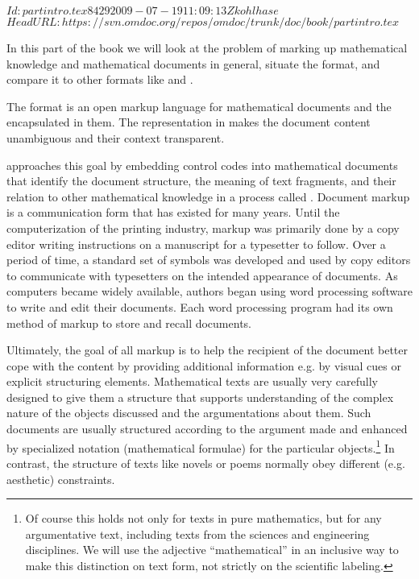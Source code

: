 \svnInfo $Id: partintro.tex 8429 2009-07-19 11:09:13Z kohlhase $
\svnKeyword $HeadURL: https://svn.omdoc.org/repos/omdoc/trunk/doc/book/partintro.tex $

\mockchapter
  In this part of the book we will look at the problem of marking up mathematical
  knowledge and mathematical documents in general, situate the {\omdoc} format, and
  compare it to other formats like {\openmath} and {\mathml}.

  The {\omdoc} format is an open markup language for mathematical documents and the
   encapsulated in them. The representation in
  {\omdoc} makes the document content unambiguous and their context transparent.

  {\omdoc} approaches this goal by embedding control codes into mathematical documents
  that identify the document structure, the meaning of text fragments, and their relation
  to other mathematical knowledge in a process called {\emph{}}.
  Document markup is a communication form that has existed for many years. Until the
  computerization of the printing industry, markup was primarily done by a copy editor
  writing instructions on a manuscript for a typesetter to follow. Over a period of time,
  a standard set of symbols was developed and used by copy editors to communicate with
  typesetters on the intended appearance of documents. As computers became widely
  available, authors began using word processing software to write and edit their
  documents.  Each word processing program had its own method of markup to store and
  recall documents.

  Ultimately, the goal of all markup is to help the recipient of the document better cope
  with the content by providing additional information e.g. by visual cues or explicit
  structuring elements. Mathematical texts are usually very carefully designed to give
  them a structure that supports understanding of the complex nature of the objects
  discussed and the argumentations about them.  Such documents are usually structured
  according to the argument made and enhanced by specialized notation (mathematical
  formulae) for the particular objects.\footnote{Of course this holds not only for texts
    in pure mathematics, but for any argumentative text, including texts from the sciences
    and engineering disciplines.  We will use the adjective ``mathematical'' in an
    inclusive way to make this distinction on text form, not strictly on the scientific
    labeling.}  In contrast, the structure of texts like novels or poems normally obey
  different (e.g. aesthetic) constraints.


